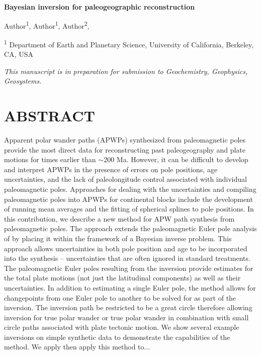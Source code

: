 \documentclass[11pt,letterpaper]{article}
\begin{document}
\begin{flushleft}
{\Large \textbf{Bayesian inversion for paleogeographic reconstruction}}

Author\textsuperscript{1},
Author\textsuperscript{1},
Author\textsuperscript{2},

\bigskip
\textsuperscript{1} Department of Earth and Planetary Science, University of California, Berkeley, CA, USA
\bigskip

\end{flushleft}

\noindent\textit{This manuscript is in preparation for submission to Geochemistry, Geophysics, Geosystems.}

\linenumbers

\section*{ABSTRACT \label{sec:ABSTRACT}}

Apparent polar wander paths (APWPs) synthesized from paleomagnetic poles provide the most direct data for reconstructing past paleogeography and plate motions for times earlier than $\sim$200 Ma. However, it can be difficult to develop and interpret APWPs in the presence of errors on pole positions, age uncertainties, and the lack of paleolongitude control associated with individual paleomagnetic poles. Approaches for dealing with the uncertainties and compiling paleomagnetic poles into APWPs for continental blocks include the development of running mean averages and the fitting of spherical splines to pole positions. In this contribution, we describe a new method for APW path synthesis from paleomagnetic poles. The approach extends the paleomagnetic Euler pole analysis of \citet{Gordon1984a} by placing it within the framework of a Bayesian inverse problem. This approach allows uncertainties in both pole position and age to be incorporated into the synthesis -- uncertainties that are often ignored in standard treatments. The paleomagnetic Euler poles resulting from the inversion provide estimates for the total plate motions (not just the latitudinal components) as well as their uncertainties. In addition to estimating a single Euler pole, the method allows for changepoints from one Euler pole to another to be solved for as part of the inversion. The inversion path be restricted to be a great circle therefore allowing inversion for true polar wander or true polar wander in combination with small circle paths associated with plate tectonic motion. We show several example inversions on simple synthetic data to demonstrate the capabilities of the method. We apply then apply this method to...
\end{document}
